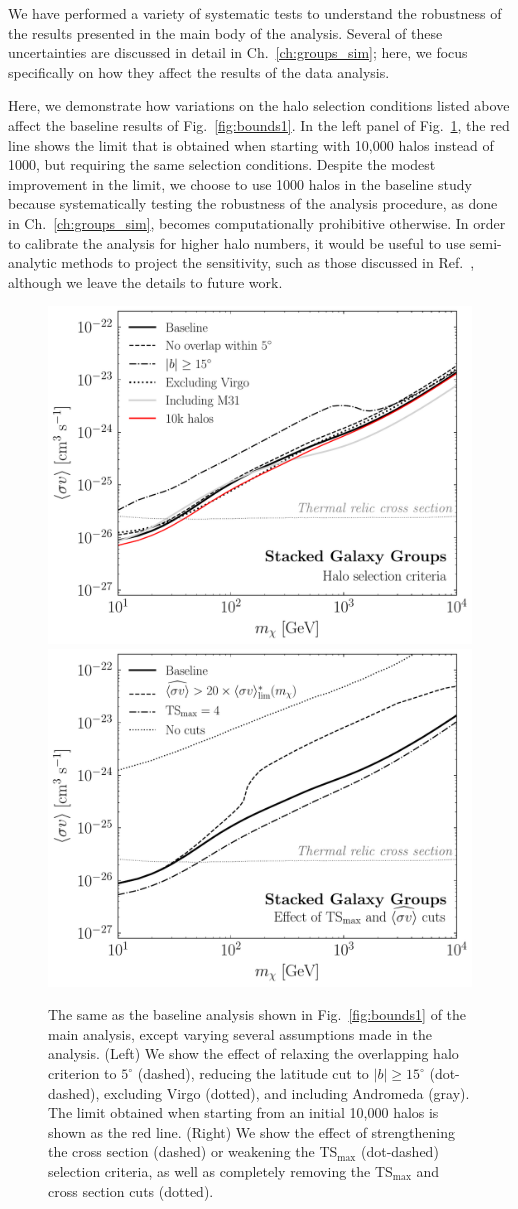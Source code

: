 We have performed a variety of systematic tests to understand the robustness of the results presented in the main body of the analysis.  Several of these uncertainties are discussed in detail in Ch.~\ref{ch:groups_sim}; here, we focus specifically on how they affect the results of the data analysis.  \vspace{0.1in}

Here, we demonstrate how variations on the halo selection conditions listed above affect the baseline results of Fig.~\ref{fig:bounds1}.  In the left panel of Fig.~\ref{fig:cutsandhalos}, the red line shows the limit that is obtained when starting with 10,000 halos instead of 1000, but requiring the same selection conditions.  Despite the modest improvement in the limit, we choose to use 1000 halos in the baseline study because systematically testing the robustness of the analysis procedure, as done in Ch.~\ref{ch:groups_sim}, becomes computationally prohibitive otherwise. In order to calibrate the analysis for higher halo numbers, it would be useful to use semi-analytic methods to project the sensitivity, such as those discussed in Ref.~\cite{Cowan:2010js,Edwards:2017mnf}, although we leave the details to future work.

\begin{figure}[b]
  \centering
	\includegraphics[width=.45\textwidth]{ch-clusters/plots/systematics_nh.pdf} 
	\includegraphics[width=.45\textwidth]{ch-clusters/plots/systematics_cuts.pdf} 
  \caption{The same as the baseline analysis shown in Fig.~\ref{fig:bounds1} of the main analysis, except varying several assumptions made in the analysis.  (Left) We show the effect of relaxing the overlapping halo criterion to $5^\circ$ (dashed), reducing the latitude cut to $|b|\geq 15^\circ$ (dot-dashed), excluding Virgo (dotted), and including Andromeda (gray).  The limit obtained when starting from an initial 10,000 halos is shown as the red line.  (Right) We show the effect of strengthening the cross section (dashed) or weakening the TS$_\text{max}$ (dot-dashed) selection criteria, as well as completely removing the TS$_\text{max}$ and cross section cuts (dotted). }
  \label{fig:cutsandhalos}
\end{figure} 

